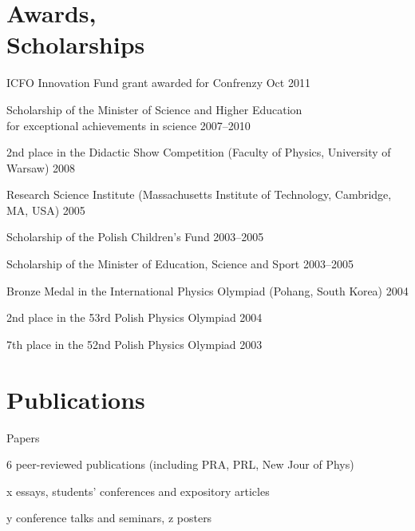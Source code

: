 \documentclass[margin,line]{resume}
\begin{document}
\begin{resume}
    \section{\mysidestyle Awards,\\Scholarships}
    \begin{list2}
    	\item ICFO Innovation Fund grant awarded for Confrenzy \hfill Oct 2011
        \item Scholarship of the Minister of Science and Higher Education\\for exceptional achievements in science \hfill 2007--2010
        \item 2nd  place in the Didactic Show Competition (Faculty of Physics, University of Warsaw)  \hfill 2008  %
        \item Research Science Institute (Massachusetts Institute of Technology, Cambridge, MA, USA) \hfill 2005
        \item Scholarship of the Polish Children's Fund \hfill 2003--2005
        \item Scholarship of the Minister of Education, Science and Sport \hfill 2003--2005
        \item Bronze Medal in the International Physics Olympiad (Pohang, South Korea) \hfill 2004
        \item 2nd  place in the 53rd Polish Physics Olympiad \hfill 2004
        \item 7th  place in the 52nd Polish Physics Olympiad \hfill 2003
    \end{list2}

\newpage

    \section{\mysidestyle Publications}
    Papers
    \begin{list2}
        \item 6 peer-reviewed publications (including PRA, PRL, New Jour of Phys)
        \item x essays, students' conferences and expository articles
        \item y conference talks and seminars, z posters 
    \end{list2}

\vspace{3mm}


\end{resume}
\end{document}

